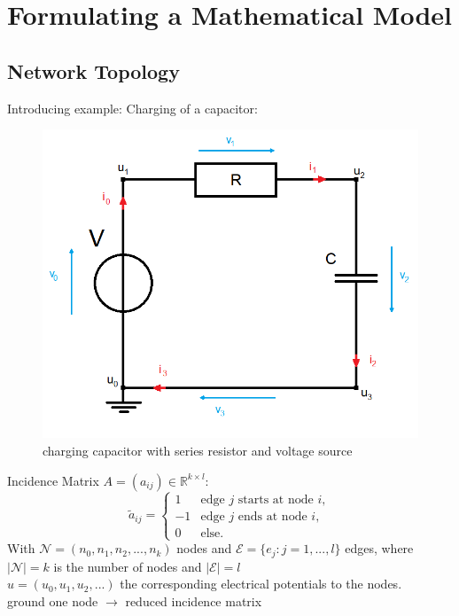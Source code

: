 






\section{Formulating a Mathematical Model}
	\subsection{Network Topology}
	\begin{frame}
		Introducing example: Charging of a capacitor:\\
		\begin{figure}[H]
			\centering
			\includegraphics[scale=0.5]{../Tex/pictures/Example1_simple.png}
			\caption{charging capacitor with series resistor and voltage source}
			\label{circuit:charging of capacitor}
		\end{figure}
	\end{frame}
	
	\begin{frame}
		Incidence Matrix $A = (a_{ij}) \in \mathbb{R}^{k \times l}$:
		\begin{displaymath}
			\tilde{a}_{ij} = 
			\begin{cases}
				1 &   \text{edge $j$ starts at node $i$},\\
				-1 &  \text{edge $j$  ends at node $i$},\\
				0 & \text{else}.				
			\end{cases}
		\end{displaymath}
		With $\mathcal{N} = (n_0, n_1, n_2, ..., n_k)$ nodes and $\mathcal{E} = \{e_{j}: j = 1,...,l\}$ edges, where $|\mathcal{N}| = k$ is the number of nodes and $|\mathcal{E}| = l$ \\
		$u = (u_0, u_1, u_2, ...)$ the corresponding electrical potentials to the nodes.\\
		ground one node $\to$ reduced incidence matrix
	\end{frame}

